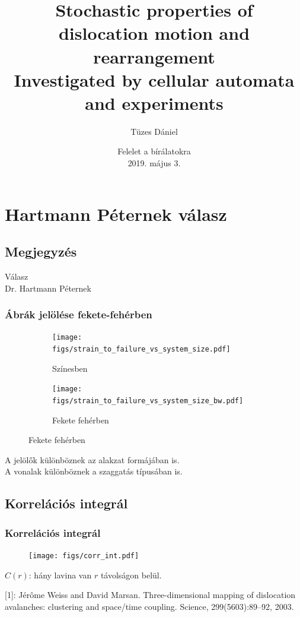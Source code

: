 \documentclass[12pt]{beamer}
\title[Doktori téma]{Stochastic properties of\\dislocation motion and rearrangement\\{\small Investigated by cellular automata and experiments}}
\author[Tüzes]{Tüzes Dániel}
\institute[ELTE Fizika Doktori Iskola] %
{
  Anyagtudomány és szilárdtestfizika, Fizika Doktori Iskola, ELTE TTK
}
\date{Felelet a bírálatokra\\2019. május 3.}
\begin{document}
 
\frame[plain]{\titlepage}
 
 
\section{Hartmann Péternek válasz}
\subsection{Megjegyzés}
\begin{frame}
\centering
\huge Válasz\\
\large Dr. Hartmann Péternek
\end{frame}
\begin{frame}
\frametitle{Ábrák jelölése fekete-fehérben}
\begin{figure}
\begin{subfigure}{0.49\textwidth}
\texttt{[image: figs/strain\_to\_failure\_vs\_system\_size.pdf]}
\caption{Színesben}
\end{subfigure}
\begin{subfigure}{0.49\textwidth}
\texttt{[image: figs/strain\_to\_failure\_vs\_system\_size\_bw.pdf]}
\caption{Fekete fehérben}
\end{subfigure}
\end{figure}
A jelölők különböznek az alakzat formájában is.\\
A vonalak különböznek a szaggatás típusában is.
\end{frame}

\subsection{Korrelációs integrál}
\begin{frame}
\frametitle{Korrelációs integrál}
{\centering
\begin{figure}
\texttt{[image: figs/corr\_int.pdf]}
\end{figure}
$C\left( r \right)$: hány lavina van $r$ távolságon belül.\\
\par}
[1]: Jérôme Weiss and David Marsan. Three-dimensional mapping of dislocation avalanches: clustering and space/time coupling. Science, 299(5603):89–92, 2003.
\end{frame}
\end{document}
